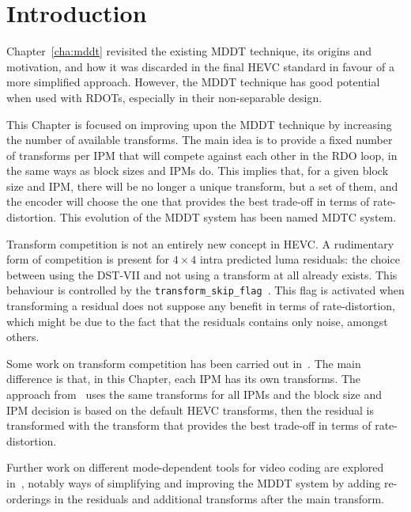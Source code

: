 \documentclass[11pt,a4paper,openright,twoside]{book}
\numberwithin{equation}{section} %
\numberwithin{figure}{section} %
\numberwithin{table}{section} %
\begin{document}
\section{Introduction}
\label{sec:introduction_mdtc}

Chapter~\ref{cha:mddt} revisited the existing \acf{MDDT} technique, its
origins and motivation, and how it was discarded in the final \ac{HEVC}
standard in favour of a more simplified approach.
However, the \ac{MDDT} technique has good potential when used with \acp{RDOT},
especially in their non-separable design.

This Chapter is focused on improving upon the \ac{MDDT} technique by
increasing the number of available transforms.
The main idea is to provide a fixed number of transforms per \acf{IPM} that
will compete against each other in the \ac{RDO} loop, in the same ways as
block sizes and \acp{IPM} do.
This implies that, for a given block size and \ac{IPM}, there will be no
longer a unique transform, but a set of them, and the encoder will choose the
one that provides the best trade-off in terms of rate-distortion.
This evolution of the \ac{MDDT} system has been named \ac{MDTC} system.

Transform competition is not an entirely new concept in \ac{HEVC}.
A rudimentary form of competition is present for $4\times4$ intra predicted
luma residuals:
the choice between using the \ac{DST}-VII and not using a transform at all
already exists.
This behaviour is controlled by the
\texttt{transform\_skip\_flag}~\cite{JCTVC-F077, JCTVC-H0208}.
This flag is activated when transforming a residual does not suppose any
benefit in terms of rate-distortion, which might be due to the fact that the
residuals contains only noise, amongst others.

Some work on transform competition has been carried out
in~\cite{arrufat-14-transform-competition-rdot,fengzou-13-rdot-lloyd-intra}.
The main difference is that, in this Chapter, each \ac{IPM} has its own
transforms.
The approach from~\cite{fengzou-13-rdot-lloyd-intra} uses the same transforms
for all \acp{IPM} and the block size and \ac{IPM} decision is based on the
default \ac{HEVC} transforms, then the residual is transformed with the
transform that provides the best trade-off in terms of rate-distortion.

Further work on different mode-dependent tools for video coding are explored
in~\cite{ma-13-mode-dependent-tools-video-coding}, notably ways of
simplifying and improving the \ac{MDDT} system by adding re-orderings in the
residuals and additional transforms after the main transform.
\end{document}
